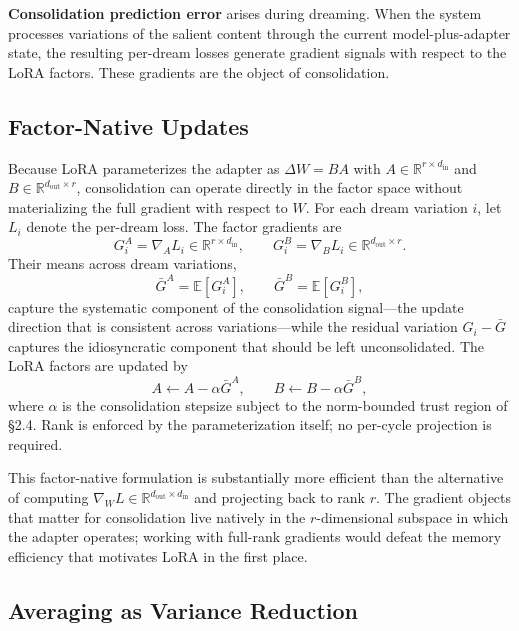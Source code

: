 \documentclass[11pt]{article}
\newcommand{\R}{\mathbb{R}}
\newcommand{\E}{\mathbb{E}}
\begin{document}
\textbf{Consolidation prediction error} arises during dreaming. When the system processes variations of the salient content through the current model-plus-adapter state, the resulting per-dream losses generate gradient signals with respect to the LoRA factors. These gradients are the object of consolidation.

\subsection{Factor-Native Updates}

Because LoRA parameterizes the adapter as $\Delta W = BA$ with $A \in \R^{r \times d_\text{in}}$ and $B \in \R^{d_\text{out} \times r}$, consolidation can operate directly in the factor space without materializing the full gradient with respect to $W$. For each dream variation $i$, let $L_i$ denote the per-dream loss. The factor gradients are
\begin{equation}
    G_i^A = \nabla_A L_i \in \R^{r \times d_\text{in}}, \qquad G_i^B = \nabla_B L_i \in \R^{d_\text{out} \times r}.
\end{equation}
Their means across dream variations,
\begin{equation}
    \bar{G}^A = \E[G_i^A], \qquad \bar{G}^B = \E[G_i^B],
\end{equation}
capture the systematic component of the consolidation signal---the update direction that is consistent across variations---while the residual variation $G_i - \bar{G}$ captures the idiosyncratic component that should be left unconsolidated. The LoRA factors are updated by
\begin{equation}
    A \gets A - \alpha \bar{G}^A, \qquad B \gets B - \alpha \bar{G}^B,
\end{equation}
where $\alpha$ is the consolidation stepsize subject to the norm-bounded trust region of \S 2.4. Rank is enforced by the parameterization itself; no per-cycle projection is required.

This factor-native formulation is substantially more efficient than the alternative of computing $\nabla_W L \in \R^{d_\text{out} \times d_\text{in}}$ and projecting back to rank $r$. The gradient objects that matter for consolidation live natively in the $r$-dimensional subspace in which the adapter operates; working with full-rank gradients would defeat the memory efficiency that motivates LoRA in the first place.

\subsection{Averaging as Variance Reduction}
\end{document}
